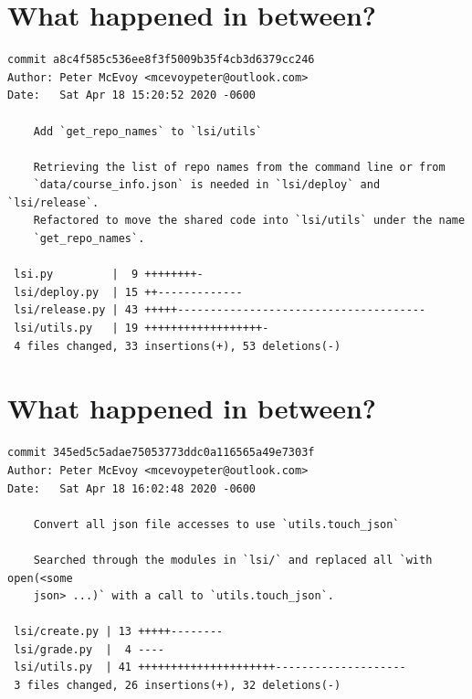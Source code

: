 \documentclass{article}
\begin{document}
\section*{What happened in between?}
\vspace{2ex}
\begin{verbatim}
commit a8c4f585c536ee8f3f5009b35f4cb3d6379cc246
Author: Peter McEvoy <mcevoypeter@outlook.com>
Date:   Sat Apr 18 15:20:52 2020 -0600

    Add `get_repo_names` to `lsi/utils`
    
    Retrieving the list of repo names from the command line or from
    `data/course_info.json` is needed in `lsi/deploy` and `lsi/release`.
    Refactored to move the shared code into `lsi/utils` under the name
    `get_repo_names`.

 lsi.py         |  9 ++++++++-
 lsi/deploy.py  | 15 ++-------------
 lsi/release.py | 43 +++++--------------------------------------
 lsi/utils.py   | 19 ++++++++++++++++++-
 4 files changed, 33 insertions(+), 53 deletions(-)
\end{verbatim}

\newpage

\section*{What happened in between?}
\vspace{2ex}
\begin{verbatim}
commit 345ed5c5adae75053773ddc0a116565a49e7303f
Author: Peter McEvoy <mcevoypeter@outlook.com>
Date:   Sat Apr 18 16:02:48 2020 -0600

    Convert all json file accesses to use `utils.touch_json`
    
    Searched through the modules in `lsi/` and replaced all `with open(<some
    json> ...)` with a call to `utils.touch_json`.

 lsi/create.py | 13 +++++--------
 lsi/grade.py  |  4 ----
 lsi/utils.py  | 41 +++++++++++++++++++++--------------------
 3 files changed, 26 insertions(+), 32 deletions(-)

\end{verbatim}

\newpage
\end{document}
